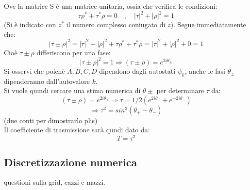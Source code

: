 Ove la matrice S è una matrice unitaria, ossia che verifica le condizioni:
$$ \tau\rho^* + \tau^*\rho = 0 \quad,\quad |\tau|^2 + |\rho|^2 = 1$$
(Si è indicato con $z^*$ il numero complesso coniugato di $z$). Segue immediatamente che:
$$ |\tau \pm \rho|^2 = |\tau|^2 + |\rho|^2 + \tau\rho^* + \tau^*\rho = |\tau|^2 + |\rho|^2 + 0 = 1$$
Cioè $\tau \pm \rho$ differiscono per una fase:
$$ |\tau \pm \rho|^2 = 1 \Rightarrow (\tau \pm \rho) = e^{2i\theta_\pm}$$
Si osservi che poichè $A,B,C,D$ dipendono dagli autostati $\psi_k$, anche le fasi $\theta_\pm$ dipenderanno dall'autovalore $k$.\\
Si vuole quindi cercare una stima numerica di $\theta\pm$ per determinare $\tau$ da:
    $$ (\tau \pm \rho) = e^{2i\theta_\pm} \Rightarrow \tau = 1/2(e^{2i\theta_+}+e^{-2i\theta_-})$$
    $$ \Rightarrow \tau^2 = sin^2(\theta_+ - \theta_-)$$
(due conti per dimostrarlo plis)
\\
Il coefficiente di trasmissione sarà qundi dato da:
    $$T = \tau^2$$

\subsection{Discretizzazione numerica}
questioni sulla grid, cazzi e mazzi.

